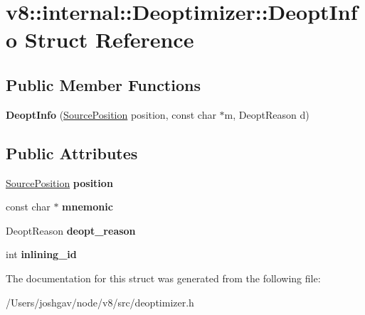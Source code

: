 \hypertarget{structv8_1_1internal_1_1_deoptimizer_1_1_deopt_info}{}\section{v8\+:\+:internal\+:\+:Deoptimizer\+:\+:Deopt\+Info Struct Reference}
\label{structv8_1_1internal_1_1_deoptimizer_1_1_deopt_info}
\subsection*{Public Member Functions}
\begin{DoxyCompactItemize}
\item 
{\bfseries Deopt\+Info} (\hyperlink{classv8_1_1internal_1_1_source_position}{Source\+Position} position, const char $\ast$m, Deopt\+Reason d)\hypertarget{structv8_1_1internal_1_1_deoptimizer_1_1_deopt_info_a357e27ef9ee2dcecf09dc2ff22cad6ed}{}\label{structv8_1_1internal_1_1_deoptimizer_1_1_deopt_info_a357e27ef9ee2dcecf09dc2ff22cad6ed}

\end{DoxyCompactItemize}
\subsection*{Public Attributes}
\begin{DoxyCompactItemize}
\item 
\hyperlink{classv8_1_1internal_1_1_source_position}{Source\+Position} {\bfseries position}\hypertarget{structv8_1_1internal_1_1_deoptimizer_1_1_deopt_info_a5ed8775af7802e50658d4ebb29961630}{}\label{structv8_1_1internal_1_1_deoptimizer_1_1_deopt_info_a5ed8775af7802e50658d4ebb29961630}

\item 
const char $\ast$ {\bfseries mnemonic}\hypertarget{structv8_1_1internal_1_1_deoptimizer_1_1_deopt_info_adf5431418943d4e779208c7bedce993f}{}\label{structv8_1_1internal_1_1_deoptimizer_1_1_deopt_info_adf5431418943d4e779208c7bedce993f}

\item 
Deopt\+Reason {\bfseries deopt\+\_\+reason}\hypertarget{structv8_1_1internal_1_1_deoptimizer_1_1_deopt_info_a4cfe4f20837cec304ac33a41b0037f00}{}\label{structv8_1_1internal_1_1_deoptimizer_1_1_deopt_info_a4cfe4f20837cec304ac33a41b0037f00}

\item 
int {\bfseries inlining\+\_\+id}\hypertarget{structv8_1_1internal_1_1_deoptimizer_1_1_deopt_info_a8bf446fd88e8e3bdd54bbb0b16f1ab0e}{}\label{structv8_1_1internal_1_1_deoptimizer_1_1_deopt_info_a8bf446fd88e8e3bdd54bbb0b16f1ab0e}

\end{DoxyCompactItemize}


The documentation for this struct was generated from the following file\+:\begin{DoxyCompactItemize}
\item 
/\+Users/joshgav/node/v8/src/deoptimizer.\+h\end{DoxyCompactItemize}
